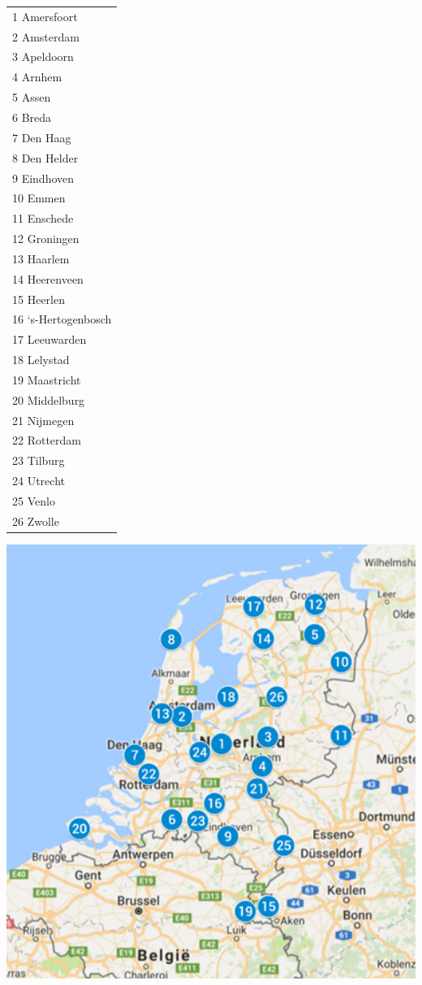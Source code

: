 \begin{table} [t]
\parbox{0.4\textwidth}{

\begin{tabular}{l}
1 Amersfoort\\ 
2 Amsterdam\\
3 Apeldoorn\\
4 Arnhem\\
5 Assen\\
6 Breda\\
7 Den Haag\\
8 Den Helder\\
9 Eindhoven\\
10 Emmen\\
11 Enschede\\
12 Groningen\\
13 Haarlem\\
14 Heerenveen\\
15 Heerlen\\
16 ‘s-Hertogenbosch\\
17 Leeuwarden\\
18 Lelystad\\
19 Maastricht\\
20 Middelburg\\
21 Nijmegen\\
22 Rotterdam\\
23 Tilburg\\
24 Utrecht\\
25 Venlo\\
26 Zwolle
\end{tabular}

\label{26cities}
}
\qquad
\begin{minipage}[c]{0.6\textwidth} 
\footnotesize
\centering
\graphicspath{ {Afbeeldingen/} }
\includegraphics[width=1.2\textwidth, center]{26cities}
\label{map1}
\end{minipage}
\end{table}

